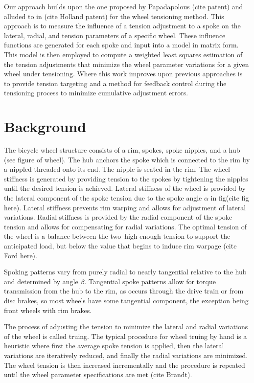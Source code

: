 \documentclass[journal]{IEEEtran}
\begin{document}
Our approach builds upon the one proposed by Papadapolous (cite patent) and alluded to in (cite Holland patent) for the wheel tensioning method. This approach is to measure the influence of a tension adjustment to a spoke on the lateral, radial, and tension parameters of a specific wheel.  These influence functions are generated for each spoke and input into a model in matrix form.  This model is then employed to compute a weighted least squares estimation of the tension adjustments that minimize the wheel parameter variations for a given wheel under tensioning.  Where this work improves upon previous approaches is to provide tension targeting and a method for feedback control during the tensioning process to minimize cumulative adjustment errors. 

\section{Background}
The bicycle wheel structure consists of a rim, spokes, spoke nipples, and a hub (see figure of wheel).  The hub anchors the spoke which is connected to the rim by a nippled threaded onto its end.  The nipple is seated in the rim. The wheel stiffness is generated by providing tension to the spokes by tightening the nipples until the desired tension is achieved. Lateral stiffness of the wheel is provided by the lateral component of the spoke tension due to the spoke angle $\alpha$ in fig(cite fig here). Lateral stiffness prevents rim warping and allows for adjustment of lateral variations. Radial stiffness is provided by the radial component of the spoke tension and allows for compensating for radial variations.  The optimal tension of the wheel is a balance between the two--high enough tension to support the anticipated load, but below the value that begins to induce rim warpage (cite Ford here). 

Spoking patterns vary from purely radial to nearly tangential relative to the hub and determined by angle $\beta$.  Tangential spoke patterns allow for torque transmission from the hub to the rim, as occurs through the drive train or from disc brakes, so most wheels have some tangential component, the exception being front wheels with rim brakes.

The process of adjusting the tension to minimize the lateral and radial variations of the wheel is called truing. The typical procedure for wheel truing by hand is a heuristic where first the average spoke tension is applied, then the lateral variations are iteratively reduced, and finally the radial variations are minimized.  The wheel tension is then increased incrementally and the procedure is repeated until the wheel parameter specifications are met (cite Brandt).
\end{document}
